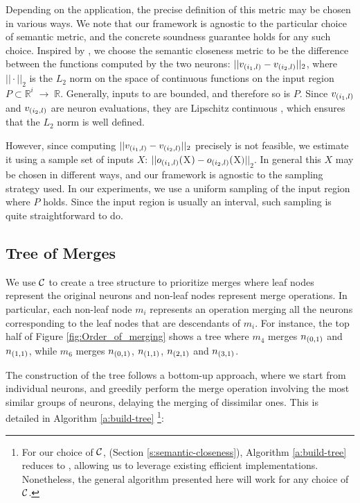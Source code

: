 Depending on the application, the precise definition of this metric may be
chosen in various ways. We note that our framework is agnostic to the particular
choice of semantic metric, and the concrete soundness guarantee holds for any such
choice. Inspired by \cite{deep-abstract}, we choose the
semantic closeness metric to be the difference between the functions computed 
by the two neurons: $||v_{(i_1,l)} - v_{(i_2,l)}||_2$, where $|| \cdot ||_2$ is
the $L_2$ norm on the space of continuous functions on the input region $P
\subset \mathbb{R}^i \;{\rightarrow}\; \mathbb{R}$.
Generally, inputs to \dnn are bounded, and therefore so is $P$. 
Since $v_{(i_1,l)}$ and $v_{(i_2,l)}$ are neuron evaluations, they are
Lipschitz continuous \cite{nn-lipschitz},  which ensures that the $L_2$ norm is
well defined.

However, since computing
$||v_{(i_1,l)} - v_{(i_2,l)}||_2$ precisely is not feasible,
we estimate it using a sample set of inputs $X$: $||o_{(i_1,l)}($X$)
- o_{(i_2,l)}($X$)||_2$. In general this $X$ may be chosen in different ways,
and our framework is agnostic to the sampling strategy used. In our experiments,
we use a uniform sampling of the input region where $P$ holds. 
Since 
the input region is usually an interval, such sampling is
quite straightforward to do.

\subsection{Tree of Merges}
\label{s:tree}

We use $\mathcal{C}$ to create a tree structure to prioritize merges where leaf nodes
represent the original neurons and non-leaf nodes represent merge operations. In
particular, each non-leaf node $m_i$ represents an operation merging all the neurons
corresponding to the leaf nodes that are descendants of $m_i$. For instance, 
the top half of Figure \ref{fig:Order_of_merging} shows a tree where $m_4$
merges $n_{(0,1)}$ and $n_{(1,1)}$, while $m_6$ merges $n_{(0,1)}$,
$n_{(1,1)}$, $n_{(2,1)}$ and $n_{(3,1)}$.

The construction of the tree follows a bottom-up approach, where we start from
individual neurons, and greedily perform the merge operation involving the most
similar groups of neurons, delaying the merging of dissimilar ones. This is
detailed in Algorithm \ref{a:build-tree} \footnote{ 
For our choice of $\mathcal{C}$, (Section \ref{s:semantic-closeness}), Algorithm
\ref{a:build-tree} reduces to \hcluster, allowing us to leverage existing
efficient implementations. Nonetheless, the
general algorithm presented here will work for any choice of $\mathcal{C}$.}:

